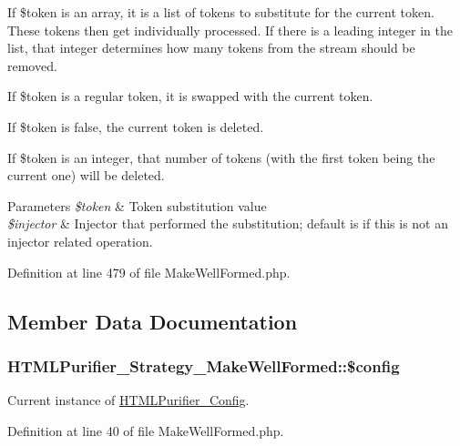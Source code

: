 If \$token is an array, it is a list of tokens to substitute for the current token. These tokens then get individually processed. If there is a leading integer in the list, that integer determines how many tokens from the stream should be removed.

If \$token is a regular token, it is swapped with the current token.

If \$token is false, the current token is deleted.

If \$token is an integer, that number of tokens (with the first token being the current one) will be deleted.


\begin{DoxyParams}{Parameters}
{\em \$token} & Token substitution value \\
\hline
{\em \$injector} & Injector that performed the substitution; default is if this is not an injector related operation. \\
\hline
\end{DoxyParams}


Definition at line 479 of file Make\+Well\+Formed.\+php.



\subsection{Member Data Documentation}
\hypertarget{classHTMLPurifier__Strategy__MakeWellFormed_a652d2a2d24b6290651cef30a794385ca}{
\subsubsection[{\$config}]{\setlength{\rightskip}{0pt plus 5cm}H\+T\+M\+L\+Purifier\+\_\+\+Strategy\+\_\+\+Make\+Well\+Formed\+::\$config\hspace{0.3cm}{\ttfamily [protected]}}}\label{classHTMLPurifier__Strategy__MakeWellFormed_a652d2a2d24b6290651cef30a794385ca}
Current instance of \hyperlink{classHTMLPurifier__Config}{H\+T\+M\+L\+Purifier\+\_\+\+Config}. 

Definition at line 40 of file Make\+Well\+Formed.\+php.

